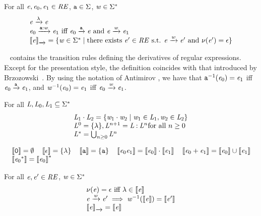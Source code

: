 \begin{definition}
 For all $\re,\re_0,\re_1\in\reSet$, $\sym\in\symAlph$, $\word\in\symAlph^*$
 \[
  \begin{array}{l}
   \re\der{\emptyWord}\re \\
   \re_0\der{\sym\strcons\word}\re_1 \mbox{ iff } \re_0\der{\sym}\re \mbox{ and } \re\der{\word}\re_1
   \\
   \opSem{\re}{\der{}}=\{\word\in\wordUniv \mid \mbox{there exists } \re'\in\reSet \mbox{ s.t. } \re\der{\word}\re' \mbox{ and } \hasEps{\re'}=\eps\}
  \end{array}
 \]
\end{definition}

~ contains the transition rules defining the derivatives of regular expressions.
Except for the presentation style, the definition coincides with that introduced by Brzozowski~\cite{Brzozowski64}. By using the notation of Antimirov \cite{Antimirov96}, we have
that $\sym^{-1}(\re_0)=\re_1$ iff $\re_0\der{\sym}\re_1$, and $\word^{-1}(\re_0)=\re_1$ iff $\re_0\der{\word}\re_1$.


\begin{definition}
 For all $\lang,\lang_0,\lang_1\subseteq\symAlph^*$
 \[
  \begin{array}{l}
   \lang_1\strcatop\lang_2=\{\word_1\strcatop\word_2\mid \word_1\in\lang_1,\word_2\in\lang_2\} \\
   \lang^0=\{\emptyWord\}, \lang^{n+1}=\lang\strcons\lang^n \mbox{for all $n\geq 0$}           \\
   \starop{\lang} = \bigcup_{n\geq 0}\lang^n
  \end{array}
 \]
\end{definition}
\begin{definition}
 \[
  \begin{array}{l}
   \sem{\none}=\emptyset\quad \sem{\eps}=\{\emptyWord\} \quad \sem{\sym}=\{\sym\} \quad
   \sem{\re_0\catop\re_1}=\sem{\re_0}\strcatop\sem{\re_1} \quad \sem{\re_0\orop\re_1}=\sem{\re_0}\cup\sem{\re_1} \\ \sem{\starop{\re_0}}=\starop{\sem{\re_0}}
  \end{array}
 \]
\end{definition}

\begin{theorem}
 For all $\re,\re'\in\reSet$, $\word\in\symAlph^*$
 \[
  \begin{array}{l}
   \hasEps{\re} = \eps \mbox{ iff } \emptyWord\in\sem{\re}      \\
   \re\der{\word}\re' \implies \word^{-1}(\sem{\re})=\sem{\re'} \\
   \opSem{\re}{\der{}}=\sem{\re}
  \end{array}
 \]
\end{theorem}

